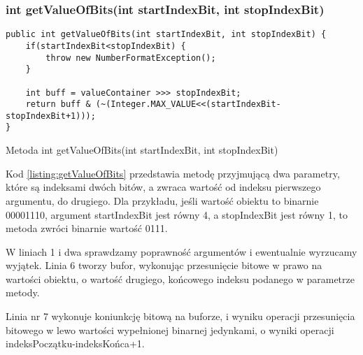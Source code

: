 	\subsubsection{int getValueOfBits(int startIndexBit, int stopIndexBit)}
	\begin{listing}[h]
		\begin{verbatim}
public int getValueOfBits(int startIndexBit, int stopIndexBit) {
	if(startIndexBit<stopIndexBit) {
		throw new NumberFormatException();
	}

	int buff = valueContainer >>> stopIndexBit;
	return buff & (~(Integer.MAX_VALUE<<(startIndexBit-stopIndexBit+1)));
}
		\end{verbatim}
		\caption{Metoda int getValueOfBits(int startIndexBit, int stopIndexBit)}
		\label{listing:getValueOfBits}
	\end{listing}
	 Kod \ref{listing:getValueOfBits} przedstawia metodę przyjmującą dwa parametry, które są indeksami dwóch bitów, a zwraca wartość od indeksu pierwszego argumentu, do drugiego. Dla przykładu, jeśli wartość obiektu to binarnie 00001110, argument startIndexBit jest równy 4, a stopIndexBit jest równy 1, to metoda zwróci binarnie wartość 0111.
	 
	 W liniach 1 i dwa sprawdzamy poprawność argumentów i ewentualnie wyrzucamy wyjątek.  Linia 6 tworzy bufor, wykonując przesunięcie bitowe w prawo na wartości obiektu, o wartość drugiego, końcowego indeksu podanego w parametrze metody.
	
	Linia nr 7 wykonuje koniunkcję bitową na buforze, i wyniku operacji przesunięcia bitowego w lewo wartości wypełnionej binarnej jedynkami, o wyniki operacji indeksPoczątku-indeksKońca+1. 
		
